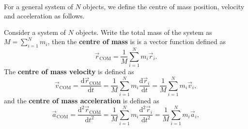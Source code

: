 \documentclass[../classical_mechanics.tex]{subfiles}
\begin{document}
        \paragraph{}
        For a general system of $N$ objects, we define the centre of mass position, velocity and acceleration as follows.
        \begin{definition}
            Consider a system of $N$ objects.
            Write the total mass of the system as $M=\sum_{i=1}^N m_i$, then the \textbf{centre of mass} is is a vector function defined as
            \begin{equation}
                \vec{r}_\text{COM} = \frac{1}{M}\sum_{i=1}^N m_i\vec{r}_i.
            \end{equation}
            The \textbf{centre of mass velocity} is defined as
            \begin{equation}
                \vec{v}_\text{COM} = \frac{\mathrm{d}\vec{r}_\text{COM}}{\mathrm{d}t} = \frac{1}{M}\sum_{i=1}^N m_i\frac{\mathrm{d}\vec{r}_i}{\mathrm{d}t} = \frac{1}{M}\sum_{i=1}^N m_i\vec{v}_i,
            \end{equation}
            and the \textbf{centre of mass acceleration} is defined as
            \begin{equation}
                \vec{a}_\text{COM} = \frac{\mathrm{d}^2\vec{r}_\text{COM}}{\mathrm{d}t^2} = \frac{1}{M}\sum_{i=1}^N m_i\frac{\mathrm{d}^2\vec{r}_i}{\mathrm{d}t^2} = \frac{1}{M}\sum_{i=1}^N m_i\vec{a}_i,
            \end{equation}
        \end{definition}
        
\end{document}

